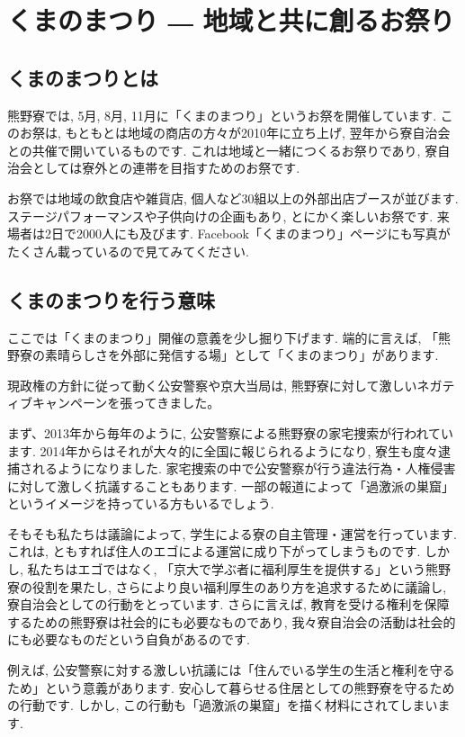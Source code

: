 
\section{くまのまつり ― 地域と共に創るお祭り}
\label{sec:kumanomaturi}

\subsection{くまのまつりとは}

熊野寮では, 5月, 8月, 11月に「くまのまつり」というお祭を開催しています. このお祭は, もともとは地域の商店の方々が2010年に立ち上げ, 翌年から寮自治会との共催で開いているものです. これは地域と一緒につくるお祭りであり, 寮自治会としては寮外との連帯を目指すためのお祭です.

お祭では地域の飲食店や雑貨店, 個人など30組以上の外部出店ブースが並びます. ステージパフォーマンスや子供向けの企画もあり, とにかく楽しいお祭です. 来場者は2日で2000人にも及びます. Facebook「くまのまつり」ページにも写真がたくさん載っているので見てみてください.

\subsection{くまのまつりを行う意味}

ここでは「くまのまつり」開催の意義を少し掘り下げます. 端的に言えば, 「熊野寮の素晴らしさを外部に発信する場」として「くまのまつり」があります.

現政権の方針に従って動く公安警察や京大当局は, 熊野寮に対して激しいネガティブキャンペーンを張ってきました。


まず、2013年から毎年のように, 公安警察による熊野寮の家宅捜索が行われています. 2014年からはそれが大々的に全国に報じられるようになり, 寮生も度々逮捕されるようになりました. 家宅捜索の中で公安警察が行う違法行為・人権侵害に対して激しく抗議することもあります.  一部の報道によって「過激派の巣窟」というイメージを持っている方もいるでしょう.

そもそも私たちは議論によって, 学生による寮の自主管理・運営を行っています. これは, ともすれば住人のエゴによる運営に成り下がってしまうものです. しかし, 私たちはエゴではなく, 「京大で学ぶ者に福利厚生を提供する」という熊野寮の役割を果たし, さらにより良い福利厚生のあり方を追求するために議論し, 寮自治会としての行動をとっています. さらに言えば, 教育を受ける権利を保障するための熊野寮は社会的にも必要なものであり, 我々寮自治会の活動は社会的にも必要なものだという自負があるのです.

例えば, 公安警察に対する激しい抗議には「住んでいる学生の生活と権利を守るため」という意義があります. 安心して暮らせる住居としての熊野寮を守るための行動です. しかし, この行動も「過激派の巣窟」を描く材料にされてしまいます.


